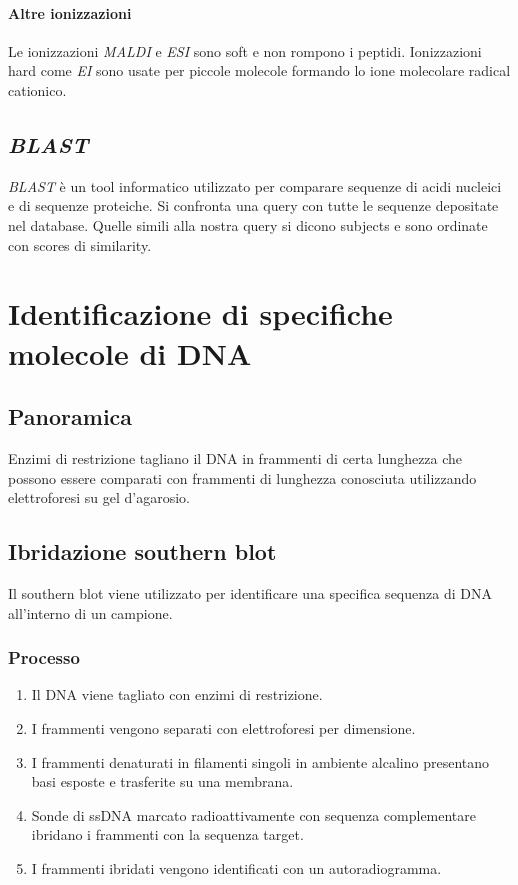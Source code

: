 			\paragraph{Altre ionizzazioni}
			Le ionizzazioni \emph{MALDI} e \emph{ESI} sono soft e non rompono i peptidi.
			Ionizzazioni hard come \emph{EI} sono usate per piccole molecole formando lo ione molecolare radical cationico.

	\subsection{\emph{BLAST}}
	\emph{BLAST} \`e un tool informatico utilizzato per comparare sequenze di acidi nucleici e di sequenze proteiche.
	Si confronta una query con tutte le sequenze depositate nel database.
	Quelle simili alla nostra query si dicono subjects e sono ordinate con scores di similarity.

\section{Identificazione di specifiche molecole di DNA}

	\subsection{Panoramica}
	Enzimi di restrizione tagliano il DNA in frammenti di certa lunghezza che possono essere comparati con frammenti di lunghezza conosciuta utilizzando elettroforesi su gel d'agarosio.

	\subsection{Ibridazione southern blot}
	Il southern blot viene utilizzato per identificare una specifica sequenza di DNA all'interno di un campione.
	
		\subsubsection{Processo}
		\begin{multicols}{2}
			\begin{enumerate}
				\item Il DNA viene tagliato con enzimi di restrizione.
				\item I frammenti vengono separati con elettroforesi per dimensione.
				\item I frammenti denaturati in filamenti singoli in ambiente alcalino presentano basi esposte e trasferite su una membrana.
				\item Sonde di ssDNA marcato radioattivamente con sequenza complementare ibridano i frammenti con la sequenza target.
				\item I frammenti ibridati vengono identificati con un autoradiogramma.
			\end{enumerate}
		\end{multicols}

